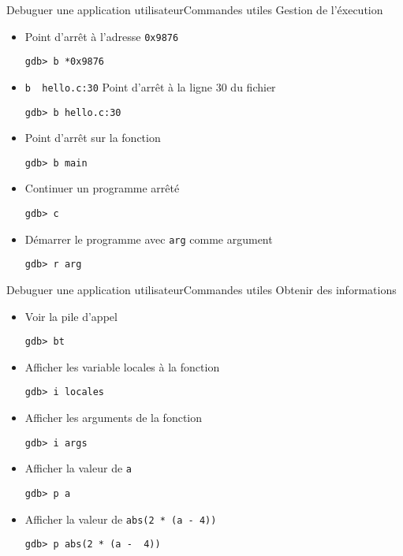 \begin{frame}[fragile=singleslide]{Debuguer une application utilisateur}{Commandes utiles}
  Gestion de l'éxecution
  \begin{itemize}
  \item Point d'arrêt à l'adresse \verb+0x9876+
    \begin{lstlisting}
gdb> b *0x9876
    \end{lstlisting}
  \item \verb+b  hello.c:30+ Point  d'arrêt à la  ligne 30  du fichier
    \begin{lstlisting}
gdb> b hello.c:30
    \end{lstlisting}
  \item Point d'arrêt sur la fonction 
    \begin{lstlisting}
gdb> b main
    \end{lstlisting}
  \item Continuer un programme arrêté
    \begin{lstlisting}
gdb> c
    \end{lstlisting}
  \item Démarrer le programme avec \verb+arg+ comme argument
    \begin{lstlisting}
gdb> r arg
    \end{lstlisting}
  \end{itemize}
\end{frame}
  
\begin{frame}[fragile=singleslide]{Debuguer une application utilisateur}{Commandes utiles}
  Obtenir des informations
  \begin{itemize}
  \item Voir la pile d'appel
    \begin{lstlisting}
gdb> bt
    \end{lstlisting}
  \item Afficher les variable locales à la fonction
    \begin{lstlisting}
gdb> i locales
    \end{lstlisting}
  \item Afficher les arguments de la fonction
    \begin{lstlisting}
gdb> i args
    \end{lstlisting}
  \item Afficher la valeur de \verb+a+
    \begin{lstlisting}
gdb> p a
    \end{lstlisting}
  \item Afficher la valeur de \verb+abs(2 * (a - 4))+
    \begin{lstlisting}
gdb> p abs(2 * (a -  4))
    \end{lstlisting}
  \end{itemize}
\end{frame}

